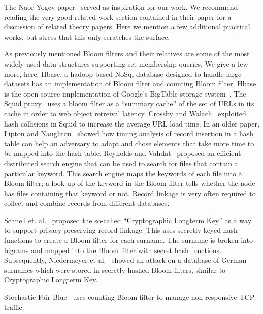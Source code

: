 The Naor-Yogev paper~\cite{naor2015bloom} served as inspiration for our work.  We recommend reading the very good related work section contained in their paper for a discussion of related theory papers.  Here we mention a few additional practical works, but stress that this only scratches the surface.

As previously mentioned Bloom filters and their relatives are some of the most widely used data structures supporting set-membership queries.  We give a few more, here. Hbase, a hadoop based NoSql database designed to handle large datasets has an implementation of Bloom filter and counting Bloom filter. Hbase is the open-source implementation of Google's BigTable storage system~\cite{chang2008bigtable}. 
The Squid proxy~\cite{fan2000summary} uses a bloom filter as a ``summary cache'' of the set of URLs in its cache in order to web object retreival latency.   Crossby and Walach~\cite{crosby2003denial} exploited hash collisions in Squid to increase the average URL load time.  In an older paper, Lipton and Naughton~\cite{lipton1993clocked} showed how timing analysis of record insertion in a hash table can help an adversary to adapt and chose elements that take more time to be mapped into the hash table. Reynolds and Vahdat~\cite{reynolds2003efficient} proposed an efficient distributed search engine that can be used to search for files that contain a particular keyword. This search engine maps the keywords of each file into a Bloom filter; a look-up of the keyword in the Bloom filter tells whether the node has files containing that keyword or not. Record linkage is very often required to collect and combine records from different databases.

Schnell et. al.~\cite{schnell2011novel} proposed the so-called ``Cryptographic Longterm Key'' as a way to support privacy-preserving record linkage. This uses secretly keyed hash functions to create a Bloom filter for each surname. The surname is broken into bigrams and mapped into the Bloom filter with secret hash functions.  Subsequently, Niedermeyer et al.~\cite{niedermeyer2014cryptanalysis} showed an attack on a database of German surnames which were stored in secretly hashed Bloom filters, similar to Cryptographic Longterm Key.

Stochastic Fair Blue~\cite{feng2001stochastic} uses counting Bloom filter to manage non-responsive TCP traffic. 

